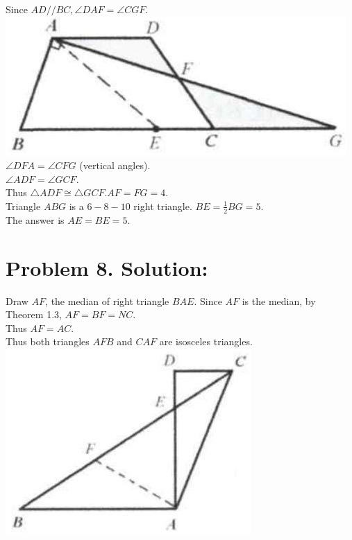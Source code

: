 \documentclass[10pt]{article}
\begin{document}
Since \(A D / / B C, \angle D A F=\angle C G F\).\\
\includegraphics[max width=\textwidth, center]{2025_04_17_97bc1f7e44d93c271a88g-020}\\
\(\angle D F A=\angle C F G\) (vertical angles).\\
\(\angle A D F=\angle G C F\).\\
Thus \(\triangle A D F \cong \triangle G C F . A F=F G=4\).\\
Triangle \(A B G\) is a \(6-8-10\) right triangle. \(B E=\frac{1}{2} B G=5\).\\
The answer is \(A E=B E=5\).

\section*{Problem 8. Solution:}
Draw \(A F\), the median of right triangle \(B A E\). Since \(A F\) is the median, by Theorem 1.3, \(A F=B F=N C\).\\
Thus \(A F=A C\).\\
Thus both triangles \(A F B\) and \(C A F\) are isosceles triangles.\\
\includegraphics[max width=\textwidth, center]{2025_04_17_97bc1f7e44d93c271a88g-020(3)}
\end{document}
